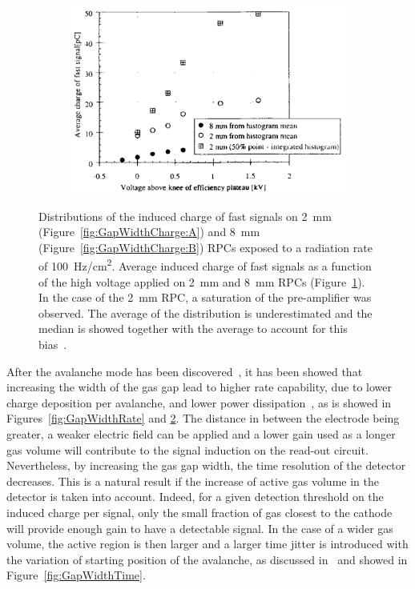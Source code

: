 \begin{figure}[H]
\begin{subfigure}{0.5\linewidth}
		\end{subfigure}
		\begin{subfigure}{\linewidth}
			\centering
			\includegraphics[width = 0.7\plotwidth]{fig/chapt4/Fast-charge-evolution.png}
			\caption{\label{fig:GapWidthCharge:C}}
		\end{subfigure}
		\caption{\label{fig:GapWidthCharge} Distributions of the induced charge of fast signals on \SI{2}{mm} (Figure~\ref{fig:GapWidthCharge:A}) and \SI{8}{mm} (Figure~\ref{fig:GapWidthCharge:B}) RPCs exposed to a radiation rate of \SI{100}{Hz/cm^2}. Average induced charge of fast signals as a function of the high voltage applied on \SI{2}{mm} and \SI{8}{mm} RPCs (Figure~\ref{fig:GapWidthCharge:C}). In the case of the \SI{2}{mm} RPC, a saturation of the pre-amplifier was observed. The average of the distribution is underestimated and the median is showed together with the average to account for this bias~\cite{ZEBALLOS96COMP}.}
	\end{figure}
	
	After the avalanche mode has been discovered~\cite{CROTTY93}, it has been showed that increasing the width of the gas gap lead to higher rate capability, due to lower charge deposition per avalanche, and lower power dissipation~\cite{ZEBALLOS96COMP}, as is showed in Figures~\ref{fig:GapWidthRate} and \ref{fig:GapWidthCharge}. The distance in between the electrode being greater, a weaker electric field can be applied and a lower gain used as a longer gas volume will contribute to the signal induction on the read-out circuit. Nevertheless, by increasing the gas gap width, the time resolution of the detector decreases. This is a natural result if the increase of active gas volume in the detector is taken into account. Indeed, for a given detection threshold on the induced charge per signal, only the small fraction of gas closest to the cathode will provide enough gain to have a detectable signal. In the case of a wider gas volume, the active region is then larger and a larger time jitter is introduced with the variation of starting position of the avalanche, as discussed in~\cite{ZEBALLOS96MRPC} and showed in Figure~\ref{fig:GapWidthTime}.
	

